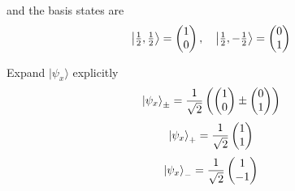 \documentclass[12pt]{article}
\begin{document}
        and the basis states are
        \[
        \ket{\tfrac{1}{2}, \tfrac{1}{2}} = \begin{pmatrix} 1 \\ 0 \end{pmatrix}, \quad
        \ket{\tfrac{1}{2}, -\tfrac{1}{2}} = \begin{pmatrix} 0 \\ 1 \end{pmatrix}
        \]

        Expand $|\psi_x\rangle$ explicitly
        \[
            \ket{\psi_x}_{\pm} = \frac{1}{\sqrt{2}} \left( \begin{pmatrix}
                1 \\ 0
            \end{pmatrix} \pm \begin{pmatrix}
                0 \\ 1
            \end{pmatrix} \right)
        \]
        \[
            \ket{\psi_x}_{+} = \frac{1}{\sqrt{2}} \begin{pmatrix}
                1 \\ 1
            \end{pmatrix}
        \]
        \[
            \ket{\psi_x}_{-} = \frac{1}{\sqrt{2}} \begin{pmatrix}
                1 \\ -1
            \end{pmatrix}
        \]
\end{document}

